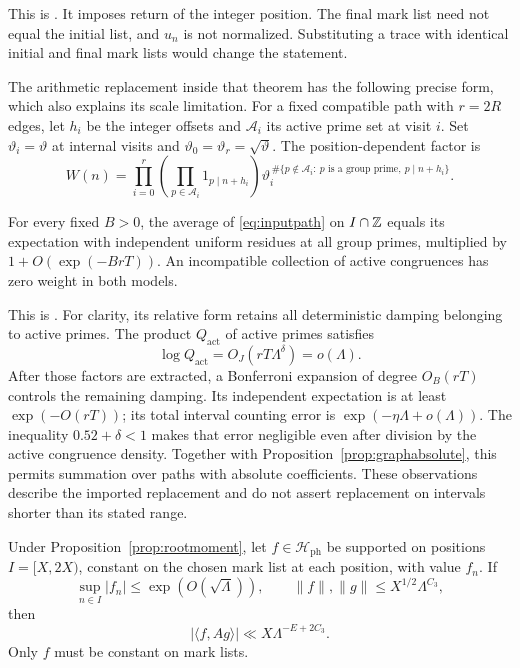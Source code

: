 This is \cite[Theorem 3.5]{weightedgraphs}. It imposes return of the
integer position. The final mark list need not equal the initial
list, and \(u_n\) is not normalized. Substituting a trace with
identical initial and final mark lists would change the statement.

The arithmetic replacement inside that theorem has the following
precise form, which also explains its scale limitation.
For a fixed compatible path with \(r=2R\) edges, let \(h_i\) be
the integer offsets and \(\mathcal A_i\) its active prime set at
visit \(i\). Set \(\vartheta_i=\vartheta\) at internal visits and
\(\vartheta_0=\vartheta_r=\sqrt{\vartheta}\).
The position-dependent factor is
\begin{equation}
 W(n)=\prod_{i=0}^{r}
       \left(\prod_{p\in\mathcal A_i}1_{p\mid n+h_i}\right)
       \vartheta_i^{\,\#\{p\notin\mathcal A_i:
                     \ p\text{ is a group prime},\ p\mid n+h_i\}}.
                                                                    \label{eq:inputpath}
\end{equation}

\begin{proposition}\label{prop:graphcrt}
For every fixed \(B>0\), the average of \eqref{eq:inputpath} on
\(I\cap\mathbb Z\) equals its expectation with independent uniform residues
at all group primes, multiplied by \(1+O(\exp(-BrT))\).
An incompatible collection of active congruences has zero weight
in both models.
\end{proposition}

This is \cite[Lemma 3.6]{weightedgraphs}. For clarity, its relative
form retains all deterministic damping belonging to active primes.
The product \(Q_{\mathrm{act}}\) of active primes satisfies
\[
              \log Q_{\mathrm{act}}
                   =O_J(rT\Lambda^\delta)=o(\Lambda).
\]
After those factors are extracted, a Bonferroni expansion of degree
\(O_B(rT)\) controls the remaining damping. Its independent
expectation is at least \(\exp(-O(rT))\); its total interval
counting error is \(\exp(-\eta\Lambda+o(\Lambda))\).
The inequality \(0.52+\delta<1\) makes that error negligible
even after division by the active congruence density. Together
with Proposition~\ref{prop:graphabsolute}, this permits summation
over paths with absolute coefficients. These observations describe
the imported replacement and do not assert replacement on intervals
shorter than its stated range.

\begin{corollary}\label{cor:graphendpoint}
Under Proposition~\ref{prop:rootmoment}, let \(f\in\mathcal H_{\mathrm{ph}}\)
be supported on positions \(I=[X,2X)\), constant on the chosen mark
list at each position, with value \(f_n\). If
\[
 \sup_{n\in I}|f_n|\le\exp(O(\sqrt{\Lambda})),\qquad
          \|f\|,\|g\|\le X^{1/2}\Lambda^{C_3},
\]
then
\begin{equation}
                    |\langle f,Ag\rangle|
                        \ll X\Lambda^{-E+2C_3}.                 \label{eq:inputendpoint}
\end{equation}
Only \(f\) must be constant on mark lists.
\end{corollary}

